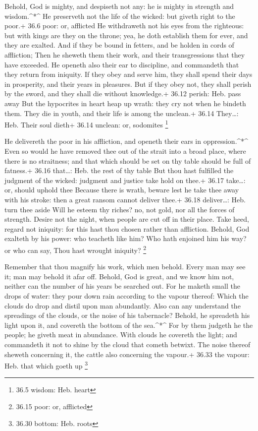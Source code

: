  Behold, God is mighty, and despiseth not any: he is mighty
in strength and wisdom.\^{}*\^{}  He preserveth not the life
of the wicked: but giveth right to the poor.+ 36.6 poor: or, afflicted
 He withdraweth not his eyes from the righteous: but with
kings are they on the throne; yea, he doth establish them for ever, and
they are exalted.  And if they be bound in fetters, and be
holden in cords of affliction;  Then he sheweth them their
work, and their transgressions that they have exceeded.  He
openeth also their ear to discipline, and commandeth that they return
from iniquity.  If they obey and serve him, they shall
spend their days in prosperity, and their years in pleasures.
 But if they obey not, they shall perish by the sword, and
they shall die without knowledge.+ 36.12 perish: Heb. pass away
 But the hypocrites in heart heap up wrath: they cry not
when he bindeth them.  They die in youth, and their life is
among the unclean.+ 36.14 They\ldots: Heb. Their soul dieth+ 36.14
unclean: or, sodomites \footnote{36.5 wisdom: Heb. heart}

 He delivereth the poor in his affliction, and openeth
their ears in oppression.\^{}*\^{}  Even so would he have
removed thee out of the strait into a broad place, where there is no
straitness; and that which should be set on thy table should be full of
fatness.+ 36.16 that\ldots: Heb. the rest of thy table  But
thou hast fulfilled the judgment of the wicked: judgment and justice
take hold on thee.+ 36.17 take\ldots: or, should uphold thee
 Because there is wrath, beware lest he take thee away with
his stroke: then a great ransom cannot deliver thee.+ 36.18
deliver\ldots: Heb. turn thee aside  Will he esteem thy
riches? no, not gold, nor all the forces of strength. 
Desire not the night, when people are cut off in their place.
 Take heed, regard not iniquity: for this hast thou chosen
rather than affliction.  Behold, God exalteth by his power:
who teacheth like him?  Who hath enjoined him his way? or
who can say, Thou hast wrought iniquity? \footnote{36.15 poor: or,
  afflicted}

 Remember that thou magnify his work, which men behold.
 Every man may see it; man may behold it afar off.
 Behold, God is great, and we know him not, neither can the
number of his years be searched out.  For he maketh small
the drops of water: they pour down rain according to the vapour thereof:
 Which the clouds do drop and distil upon man abundantly.
 Also can any understand the spreadings of the clouds, or
the noise of his tabernacle?  Behold, he spreadeth his
light upon it, and covereth the bottom of the sea.\^{}*\^{}
 For by them judgeth he the people; he giveth meat in
abundance.  With clouds he covereth the light; and
commandeth it not to shine by the cloud that cometh betwixt.
 The noise thereof sheweth concerning it, the cattle also
concerning the vapour.+ 36.33 the vapour: Heb. that which goeth up
\footnote{36.30 bottom: Heb. roots}

